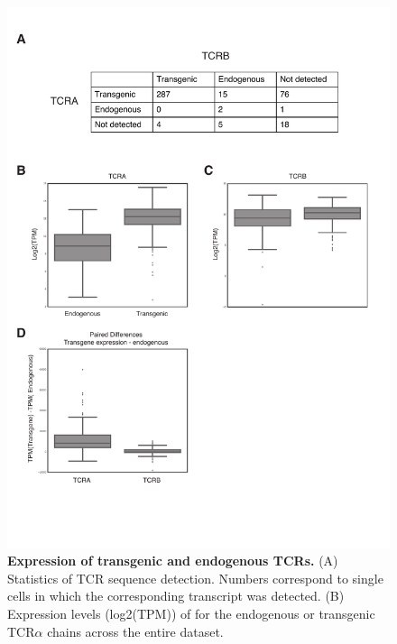 \begin{figure}
    \centering
    \includegraphics[width=\textwidth]{"Fig S10 rev3"}
    \caption[Expression of transgenic and endogenous TCRs]{\textbf{Expression of transgenic and endogenous TCRs.} (A) Statistics of TCR sequence detection. Numbers correspond to single cells in which the corresponding transcript was detected. (B) Expression levels (log2(TPM)) of for the endogenous or transgenic TCR\( \alpha \) chains across the entire dataset.}
    \label{fig:ms10}
\end{figure}

